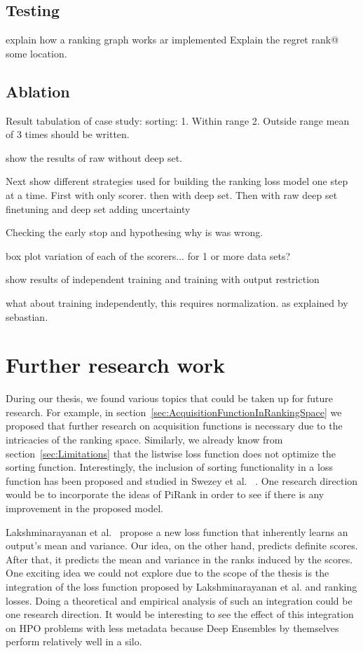 \documentclass[12pt, twoside, ngerman]{report}
\begin{document}
\subsection{Testing}
explain how a ranking graph works ar implemented
Explain the regret rank@ some location.

\subsection{Ablation}

Result tabulation of case study: sorting:
1.  Within range
2.   Outside range 
mean of 3 times should be written.

show the results of raw without deep set.

Next show different strategies used for building the ranking loss model one step at a time.
First with only scorer.
then with deep set.
Then with raw deep set
finetuning and deep set
adding uncertainty

Checking the early stop and hypothesing why is was wrong.

box plot variation of each of the scorers... for 1 or more data sets?

show results of independent training and training with output restriction

what about training independently,   this requires normalization. 
as explained by sebastian.
\fi

\section{Further research work}

During our thesis, we found various topics that could be taken up for future research. For example, in section~\ref{sec:AcquisitionFunctionInRankingSpace} we proposed that further research on acquisition functions is necessary due to the intricacies of the ranking space. Similarly, we already know from section~\ref{sec:Limitations} that the listwise loss function does not optimize the sorting function.
Interestingly, the inclusion of sorting functionality in a loss function has been proposed and studied in Swezey et al. ~\cite{PiRank}.
One research direction would be to incorporate the ideas of PiRank in order to see if there is any improvement in the proposed model.

Lakshminarayanan et al.~\cite{DeepEnsemblePaper} propose a new loss function that inherently learns an output's mean and variance. Our idea, on the other hand, predicts definite scores. After that, it predicts the mean and variance in the ranks induced by the scores. One exciting idea we could not explore due to the scope of the thesis is the integration of the loss function proposed by Lakshminarayanan et al. and ranking losses. Doing a theoretical and empirical analysis of such an integration could be one research direction.
It would be interesting to see the effect of this integration on HPO problems with less metadata because Deep Ensembles by themselves perform relatively well in a silo.
\end{document}
